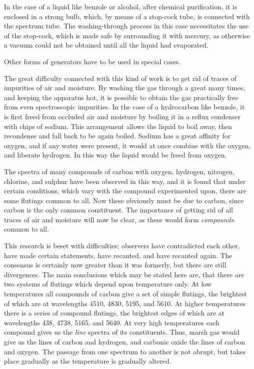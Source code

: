 \documentclass[a4paper, 12pt, oneside, polutonikogreek, english]{article}
\begin{document}
In the case of a liquid like benzole or alcohol, after chemical purification, it is enclosed in a strong bulb, which, by means of a stop-cock tube, is connected with the spectrum tube. The washing-through process in this case necessitates the use of the stop-cock, which is made safe by surrounding it with mercury, as otherwise a vacuum could not be obtained until all the liquid had evaporated.

Other forms of generators have to be used in special cases.

The great difficulty connected with this kind of work is to get rid of traces of impurities of air and moisture. By washing the gas through a great many times, and keeping the apparatus hot, it is possible to obtain the gas practically free from even spectroscopic impurities. In the case of a hydrocarbon like benzole, it is first freed from occluded air and moisture by boiling it in a reflux condenser with chips of sodium. This arrangement allows the liquid to boil away, then recondense and fall back to be again boiled. Sodium has a great affinity for oxygen, and if any water were present, it would at once combine with the oxygen, and liberate hydrogen. In this way the liquid would be freed from oxygen.

The spectra of many compounds of carbon with oxygen, hydrogen, nitrogen, chlorine, and sulphur have been observed in this way, and it is found that under certain conditions, which vary with the compound experimented upon, there are some flutings common to all. Now these obviously must be due to carbon, since carbon is the only common constituent. The importance of getting rid of all traces of air and moisture will now be clear, as these would form \emph{compounds} common to all.

This research is beset with difficulties; observers have contradicted each other, have made certain statements, have recanted, and have recanted again. The consensus is certainly now greater than it was formerly, but there are still divergences. The main conclusions which may be stated here are, that there are two systems of flutings which depend upon temperature only. At low temperatures all compounds of carbon give a set of simple flutings, the brightest of which are at wavelengths 4510, 4830, 5195, and 5610. At higher temperatures there is a series of compound flutings, the brightest edges of which are at wavelengths 438, 4738, 5165, and 5640. At very high temperatures each compound gives us the \emph{line} spectra of its constituents. Thus, marsh gas would give us the lines of carbon and hydrogen, and carbonic oxide the lines of carbon and oxygen. The passage from one spectrum to another is not abrupt, but takes place gradually as the temperature is gradually altered.
\end{document}
